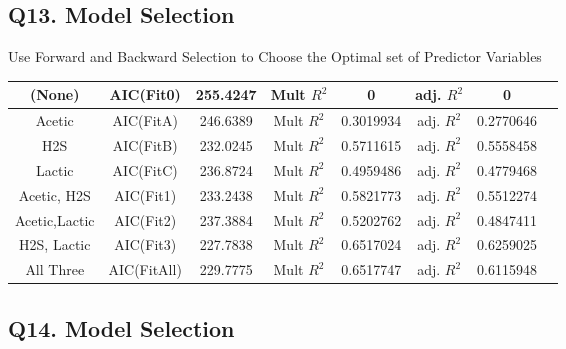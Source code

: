 \documentclass[a4paper,12pt]{article}
\begin{document}
\subsection*{Q13. Model Selection}
Use Forward and Backward Selection to Choose the Optimal set of Predictor Variables

{
	\large
	\begin{center}
		\begin{tabular}{|c|c|c|c|c|c|c|c||}\hline
			(None)	&	AIC(Fit0)	&	255.4247	&	Mult $R^2$	&	0	&	adj. $R^2$	&	0	\\ \hline
			Acetic	&	 AIC(FitA)	&	246.6389	&	Mult $R^2$	&	0.3019934	&	adj. $R^2$	&	0.2770646	\\ \hline
			H2S	&	 AIC(FitB)	&	232.0245	&	Mult $R^2$	&	0.5711615	&	adj. $R^2$	&	0.5558458	\\ \hline
			Lactic	&	 AIC(FitC)	&	236.8724	&	Mult $R^2$	&	0.4959486	&	adj. $R^2$	&	0.4779468	\\ \hline
			Acetic, H2S  	&	 AIC(Fit1)	&	233.2438	&	Mult $R^2$	&	0.5821773	&	adj. $R^2$	&	0.5512274	\\ \hline
			Acetic,Lactic 	&	 AIC(Fit2)	&	237.3884	&	Mult $R^2$	&	0.5202762	&	adj. $R^2$	&	0.4847411	\\ \hline
			H2S, Lactic	&	 AIC(Fit3)	&	227.7838	&	Mult $R^2$	&	0.6517024	&	adj. $R^2$	&	0.6259025	\\ \hline
			All Three	&	 AIC(FitAll)	&	229.7775	&	Mult $R^2$	&	0.6517747	&	adj. $R^2$	&	0.6115948	\\ \hline
			
		\end{tabular} 
	\end{center}
}

\newpage
\subsection*{Q14. Model Selection}
\end{document}
